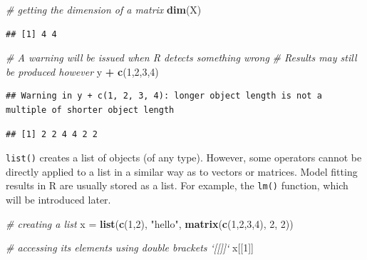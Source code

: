 \documentclass[
]{book}
\newenvironment{Shaded}{\begin{snugshade}}{\end{snugshade}}
\newcommand{\CommentTok}[1]{\textcolor[rgb]{0.56,0.35,0.01}{\textit{#1}}}
\newcommand{\DecValTok}[1]{\textcolor[rgb]{0.00,0.00,0.81}{#1}}
\newcommand{\KeywordTok}[1]{\textcolor[rgb]{0.13,0.29,0.53}{\textbf{#1}}}
\newcommand{\NormalTok}[1]{#1}
\newcommand{\OperatorTok}[1]{\textcolor[rgb]{0.81,0.36,0.00}{\textbf{#1}}}
\newcommand{\StringTok}[1]{\textcolor[rgb]{0.31,0.60,0.02}{#1}}
\begin{document}
\begin{Shaded}
\begin{Highlighting}[]
  \CommentTok{# getting the dimension of a matrix}
  \KeywordTok{dim}\NormalTok{(X)}
\end{Highlighting}
\end{Shaded}

\begin{verbatim}
## [1] 4 4
\end{verbatim}

\begin{Shaded}
\begin{Highlighting}[]
  \CommentTok{# A warning will be issued when R detects something wrong}
  \CommentTok{# Results may still be produced however}
\NormalTok{  y }\OperatorTok{+}\StringTok{ }\KeywordTok{c}\NormalTok{(}\DecValTok{1}\NormalTok{,}\DecValTok{2}\NormalTok{,}\DecValTok{3}\NormalTok{,}\DecValTok{4}\NormalTok{)}
\end{Highlighting}
\end{Shaded}

\begin{verbatim}
## Warning in y + c(1, 2, 3, 4): longer object length is not a multiple of shorter object length
\end{verbatim}

\begin{verbatim}
## [1] 2 2 4 4 2 2
\end{verbatim}

\texttt{list()} creates a list of objects (of any type). However, some operators cannot be directly applied to a list in a similar way as to vectors or matrices. Model fitting results in R are usually stored as a list. For example, the \texttt{lm()} function, which will be introduced later.

\begin{Shaded}
\begin{Highlighting}[]
  \CommentTok{# creating a list}
\NormalTok{  x =}\StringTok{ }\KeywordTok{list}\NormalTok{(}\KeywordTok{c}\NormalTok{(}\DecValTok{1}\NormalTok{,}\DecValTok{2}\NormalTok{), }\StringTok{"hello"}\NormalTok{, }\KeywordTok{matrix}\NormalTok{(}\KeywordTok{c}\NormalTok{(}\DecValTok{1}\NormalTok{,}\DecValTok{2}\NormalTok{,}\DecValTok{3}\NormalTok{,}\DecValTok{4}\NormalTok{), }\DecValTok{2}\NormalTok{, }\DecValTok{2}\NormalTok{))}

  \CommentTok{# accessing its elements using double brackets `[[]]` }
\NormalTok{  x[[}\DecValTok{1}\NormalTok{]]}
\end{Highlighting}
\end{Shaded}
\end{document}
